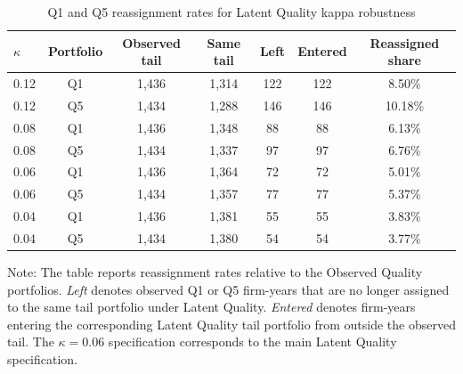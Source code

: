 \begin{table}[H]
\centering
\footnotesize
\renewcommand{\arraystretch}{1.12}
\setlength{\tabcolsep}{4pt}
\caption[Q1 and Q5 reassignment rates for Latent Quality kappa robustness]{Q1 and Q5 reassignment rates for Latent Quality kappa robustness}
\label{tab:latent_kappa_reassignment}
\begin{threeparttable}
\begin{tabular*}{\textwidth}{@{\extracolsep{\fill}}lcccccc}
\toprule
$\kappa$ & Portfolio & Observed tail & Same tail & Left & Entered & Reassigned share \\
\midrule
0.12 & Q1 & 1,436 & 1,314 & 122 & 122 & 8.50\% \\
0.12 & Q5 & 1,434 & 1,288 & 146 & 146 & 10.18\% \\
0.08 & Q1 & 1,436 & 1,348 & 88 & 88 & 6.13\% \\
0.08 & Q5 & 1,434 & 1,337 & 97 & 97 & 6.76\% \\
0.06 & Q1 & 1,436 & 1,364 & 72 & 72 & 5.01\% \\
0.06 & Q5 & 1,434 & 1,357 & 77 & 77 & 5.37\% \\
0.04 & Q1 & 1,436 & 1,381 & 55 & 55 & 3.83\% \\
0.04 & Q5 & 1,434 & 1,380 & 54 & 54 & 3.77\% \\
\bottomrule
\end{tabular*}
\begin{tablenotes}[flushleft]
\scriptsize
\item Note: The table reports reassignment rates relative to the Observed Quality portfolios. \emph{Left} denotes observed Q1 or Q5 firm-years that are no longer assigned to the same tail portfolio under Latent Quality. \emph{Entered} denotes firm-years entering the corresponding Latent Quality tail portfolio from outside the observed tail. The $\kappa=0.06$ specification corresponds to the main Latent Quality specification.
\end{tablenotes}
\end{threeparttable}
\end{table}
